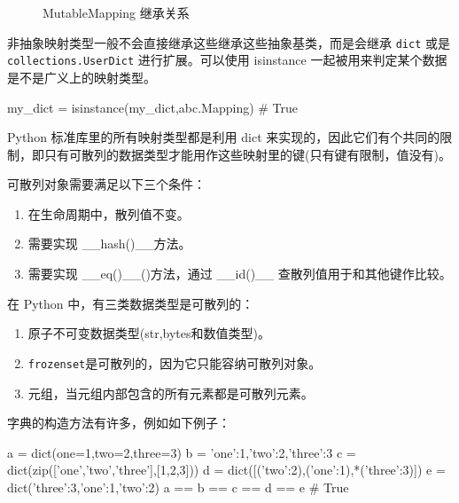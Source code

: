 \begin{figure}[H]
    \caption{MutableMapping 继承关系}
    \label{MutableMapping 继承关系}
\end{figure}

非抽象映射类型一般不会直接继承这些继承这些抽象基类，而是会继承 \texttt{dict} 或是 \texttt{collections.UserDict} 进行扩展。可以使用 isinstance 一起被用来判定某个数据是不是广义上的映射类型。

\begin{python}
my_dict = {}
isinstance(my_dict,abc.Mapping) # True
\end{python}

Python 标准库里的所有映射类型都是利用 dict 来实现的，因此它们有个共同的限制，即只有可散列的数据类型才能用作这些映射里的键(只有键有限制，值没有)。

可散列对象需要满足以下三个条件：
\begin{enumerate}
    \item 在生命周期中，散列值不变。
    \item 需要实现 \_\_hash()\_\_方法。
    \item 需要实现 \_\_eq()\_\_()方法，通过 \_\_id()\_\_ 查散列值用于和其他键作比较。
\end{enumerate}

在 Python 中，有三类数据类型是可散列的：
\begin{enumerate}
    \item 原子不可变数据类型(str,bytes和数值类型)。
    \item \texttt{frozenset}是可散列的，因为它只能容纳可散列对象。
    \item 元组，当元组内部包含的所有元素都是可散列元素。
\end{enumerate}

字典的构造方法有许多，例如如下例子：
\begin{python}
a = dict(one=1,two=2,three=3)
b = {'one':1,'two':2,'three':3}
c = dict(zip(['one','two','three'],[1,2,3]))
d = dict([('two':2),('one':1),*('three':3)])
e = dict({'three':3,'one':1,'two':2})
a == b == c == d == e       # True
\end{python}

